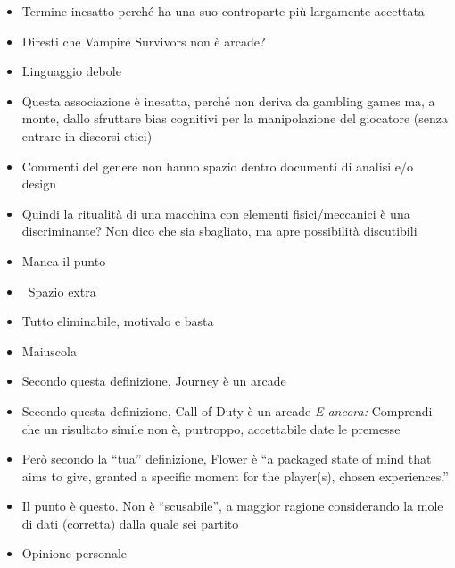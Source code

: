 {\begin{itemize}
  \item {} Termine inesatto perché ha una suo controparte più largamente accettata
  \item {} Diresti che Vampire Survivors non è arcade?
  \item {} Linguaggio debole
  \item {} Questa associazione è inesatta, perché non deriva da gambling games ma, a monte, dallo sfruttare bias cognitivi per la manipolazione del giocatore (senza entrare in discorsi etici)
  \item {} Commenti del genere non hanno spazio dentro documenti di analisi e/o design
  \item {} Quindi la ritualità di una macchina con elementi fisici/meccanici è una discriminante? Non dico che sia sbagliato, ma apre possibilità discutibili
  \item {} Manca il punto
  \item \rvVuoto\ Spazio extra
  \item {} Tutto eliminabile, motivalo e basta
  \item {} Maiuscola
  \item {} Secondo questa definizione, Journey è un arcade
  \item {} Secondo questa definizione, Call of Duty è un arcade \emph{E ancora:} Comprendi che un risultato simile non è, purtroppo, accettabile date le premesse
  \item {} Però secondo la ``tua'' definizione, Flower è ``a packaged state of mind that aims to give, granted a specific moment for the player(s), chosen experiences.''
  \item {} Il punto è questo. Non è ``scusabile'', a maggior ragione considerando la mole di dati (corretta) dalla quale sei partito
  \item {} Opinione personale

\end{itemize}}
